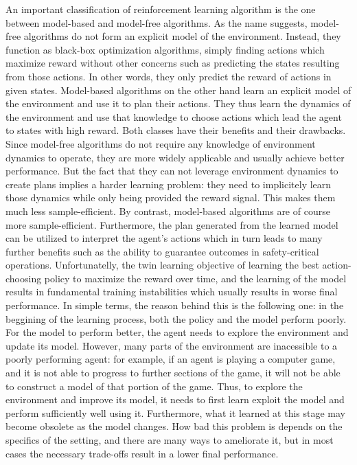 An important classification of reinforcement learning algorithm is the one between
model-based and model-free algorithms.
As the name suggests, model-free algorithms do not form an explicit model of the environment.
Instead, they function as black-box optimization algorithms, simply finding actions which maximize
reward without other concerns such as predicting the states resulting from those actions.
In other words, they only predict the reward of actions in given states.
Model-based algorithms on the other hand learn an explicit model of the environment
and use it to plan their actions.
They thus learn the dynamics of the environment and use that knowledge to choose actions
which lead the agent to states with high reward.
Both classes have their benefits and their drawbacks.
Since model-free algorithms do not require any knowledge of environment dynamics
to operate, they are more widely applicable and usually achieve better performance.
But the fact that they can not leverage environment dynamics to create plans implies
a harder learning problem: they need to implicitely learn those dynamics
while only being provided the reward signal. 
This makes them much less sample-efficient.
By contrast, model-based algorithms are of course more sample-efficient.
Furthermore, the plan generated from the learned model can be utilized to interpret the
agent's actions which in turn leads to many further benefits such as
the ability to guarantee outcomes in safety-critical operations.
Unfortunatelly, the twin learning objective of learning the best action-choosing policy 
to maximize the reward over time, and the learning of the model results
in fundamental training instabilities which usually results in worse final performance.
In simple terms, the reason behind this is the following one:
in the beggining of the learning process, both the policy and the model perform poorly.
For the model to perform better, the agent needs to explore the environment and
update its model.
However, many parts of the environment are inacessible to a poorly performing agent:
for example, if an agent is playing a computer game, and it is not able to progress to further
sections of the game, it will not be able to construct a model of that portion of the game.
Thus, to explore the environment and improve its model, it needs to first learn exploit 
the model and perform sufficiently well using it.
Furthermore, what it learned at this stage may become obsolete as the model changes.
How bad this problem is depends on the specifics of the setting,
and there are many ways to ameliorate it,
but in most cases the necessary trade-offs result in a lower final performance.

